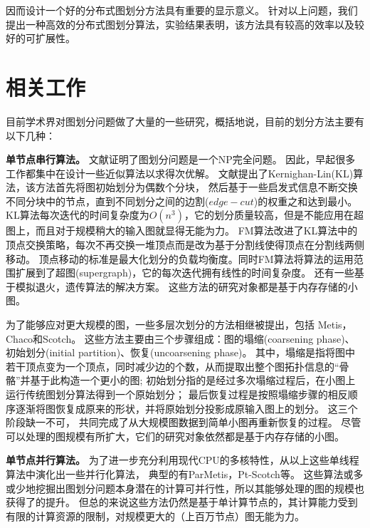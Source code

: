 \documentclass[master]{njuthesis}
\begin{document}
因而设计一个好的分布式图划分方法具有重要的显示意义。
针对以上问题，我们提出一种高效的分布式图划分算法，实验结果表明，该方法具有较高的效率以及较好的可扩展性。

\section{相关工作}
目前学术界对图划分问题做了大量的一些研究，概括地说，目前的划分方法主要有以下几种：

\textbf{单节点串行算法。 } 文献\cite{garey1974somenp}证明了图划分问题是一个NP完全问题。 
因此，早起很多工作都集中在设计一些近似算法以求得次优解。
文献\cite{kernighan1970efficient}提出了Kernighan-Lin(KL)算法，该方法首先将图初始划分为偶数个分块，
然后基于一些启发式信息不断交换不同分块中的节点，直到不同划分之间的边割($edge-cut$)的权重之和达到最小。
KL算法每次迭代的时间复杂度为$O(n^3)$，它的划分质量较高，但是不能应用在超图上，而且对于规模稍大的输入图就显得无能为力。
FM算法\cite{fiduccia1988linear}改进了KL算法中的顶点交换策略，每次不再交换一堆顶点而是改为基于分割线使得顶点在分割线两侧移动。
顶点移动的标准是最大化划分的负载均衡度。同时FM算法将算法的运用范围扩展到了超图(supergraph)，它的每次迭代拥有线性的时间复杂度。
还有一些基于模拟退火\cite{johnson1989optimization}，遗传算法\cite{bui1996genetic}的解决方案。
这些方法的研究对象都是基于内存存储的小图。

为了能够应对更大规模的图，一些多层次划分的方法相继被提出，包括 Metis\cite{Karypis95metis}，Chaco\cite{leland1995chaco}和Scotch\cite{pellegrini1996scotch}。
这些方法主要由三个步骤组成：图的塌缩(coarsening phase)、初始划分(initial partition)、恢复(uncoarsening phase)。
其中，塌缩是指将图中若干顶点变为一个顶点，同时减少边的个数，从而提取出整个图拓扑信息的“骨骼”并基于此构造一个更小的图; 
初始划分指的是经过多次塌缩过程后，在小图上运行传统图划分算法得到一个原始划分；
最后恢复过程是按照塌缩步骤的相反顺序逐渐将图恢复成原来的形状，并将原始划分投影成原输入图上的划分。
这三个阶段缺一不可， 共同完成了从大规模图数据到简单小图再重新恢复的过程。
尽管可以处理的图规模有所扩大，它们的研究对象依然都是基于内存存储的小图。

\textbf{单节点并行算法。 } 为了进一步充分利用现代CPU的多核特性，从以上这些单线程算法中演化出一些并行化算法，
典型的有ParMetis\cite{karypis1998parallel}，Pt-Scotch\cite{chevalier2008pt}等。 
这些算法或多或少地挖掘出图划分问题本身潜在的计算可并行性，所以其能够处理的图的规模也获得了的提升。 
但总的来说这些方法仍然是基于单计算节点的，其计算能力受到有限的计算资源的限制，对规模更大的（上百万节点）图无能为力。
\end{document}
